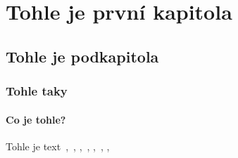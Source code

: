 \hypertarget{tohle-je-prvnuxed-kapitola}{%
\chapter{Tohle je první kapitola}\label{tohle-je-prvnuxed-kapitola}}

\hypertarget{tohle-je-podkapitola}{%
\section{Tohle je podkapitola}\label{tohle-je-podkapitola}}

\hypertarget{tohle-taky}{%
\subsection{Tohle taky}\label{tohle-taky}}

\hypertarget{co-je-tohle}{%
\subsubsection{Co je tohle?}\label{co-je-tohle}}

Tohle je text~\parencite[19]{dokulil67},~\parencite[19]{dokulil62},
\parencite[19]{cechova00},~\parencite[5]{sevcikova14},
\parencite[5]{sevcikova16},~\parencite[5]{simandl2016},
\parencite[]{derinet17},~\parencite[]{enc17}
